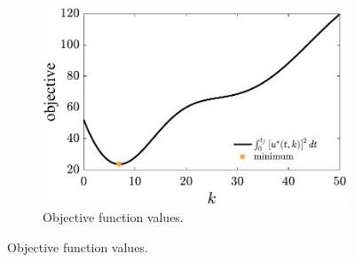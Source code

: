 \begin{figure}[t]
\centering

\begin{subfigure}[b]{0.5\textwidth}
    \centering
    \includegraphics[width=\textwidth]{../ch4/figures/transfer_psi}
    \caption{Objective function values.}
\end{subfigure}


\end{figure}

